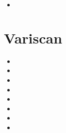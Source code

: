 \begin{small}
\begin{itemize}
\item[\twothousandnineteen] 
\end{itemize}
\end{small}


\section{Variscan}

\begin{small}
\begin{itemize}
\item[\nineteenninetynine] 
\item[\twothousandfour] 
\item[\twothousandseven] 
\item[\twothousandthirteen] 
\item[\twothousandseventeen] 
\item[\twothousandeighteen] 
\item[\twothousandtwenty] 
\item[\twothousandtwentyone] 
\end{itemize}
\end{small}






